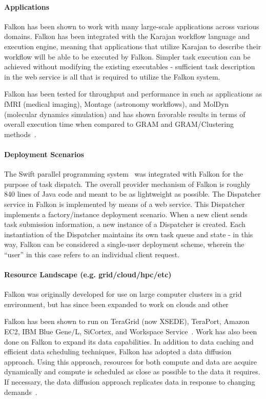 \documentclass{sig-alternate}
\begin{document}
\paragraph{Applications}

Falkon has been shown to work with many large-scale
applications across various domains. Falkon
has been integrated with the Karajan workflow language
and execution engine, meaning that applications
that utilize Karajan to describe their workflow
will be able to be executed by Falkon. Simpler
task execution can be achieved without
modifying the existing executables - sufficient
task description in the web service is all that
is required to utilize the Falkon system.

Falkon has been tested for throughput
and performance in such as applications
as fMRI (medical imaging), Montage (astronomy workflows),
and MolDyn (molecular dynamics simulation) and has shown
favorable results in terms of overall execution time when compared
to GRAM and GRAM/Clustering methods~\cite{1362680}.

\paragraph{Deployment Scenarios}

The Swift parallel programming system~\cite{Wilde2011} was integrated
with Falkon for the purpose of task dispatch. The overall provider
mechanism of Falkon is roughly 840 lines of Java code and meant
to be as lightweight as possible. The Dispatcher service
in Falkon is implemented by means of a web service.
This Dispatcher implements a factory/instance deployment scenario.
When a new client sends task submission information, a new instance
of a Dispatcher is created. Each instantiation of the Dispatcher maintains
its own task queue and state - in this way, Falkon can be considered
a single-user deployment scheme, wherein the ``user'' in this case
refers to an individual client request.

\paragraph{Resource Landscape (e.g. grid/cloud/hpc/etc)}
Falkon was originally developed for use on large computer clusters
in a grid environment, but has since been expanded to work on
clouds and other

Falkon has been shown to run on TeraGrid (now XSEDE), TeraPort, Amazon EC2, IBM
Blue Gene/L, SiCortex, and Workspace Service~\cite{1362680}.
 Work has also been done on Falkon
to expand its data capabilities. In addition to data caching and
efficient data scheduling techniques, Falkon has adopted a
data diffusion approach. Using this approach, resources for
both compute and data are acquire dynamically and compute
is scheduled as close as possible to the data it requires.
If necessary, the data diffusion approach replicates data
in response to changing demands~\cite{raicu2008accelerating}.
\end{document}
